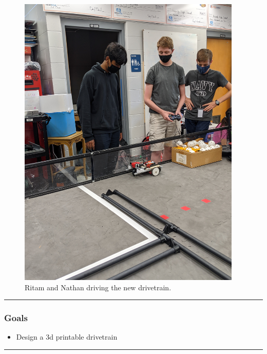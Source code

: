 \begin{figure}[htp]
\centering
\includegraphics[width=0.95\textwidth, angle=0]{Meetings/October/10-14-21/10-14-21_Team_Figure1 - Nathan Forrer.jpg}
\caption{Ritam and Nathan driving the new drivetrain.}
\label{fig:pic1}
\end{figure}

\noindent\hfil\rule{\textwidth}{.4pt}\hfil
\subsubsection*{Goals}
\begin{itemize}
    \item Design a 3d printable drivetrain

\end{itemize} 

\noindent\hfil\rule{\textwidth}{.4pt}\hfil

